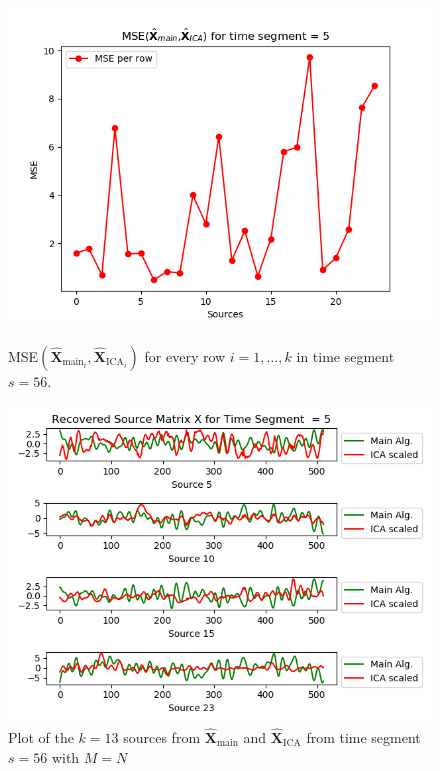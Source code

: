 \begin{figure}[H]
\begin{widepage}
    \begin{minipage}[t]{.45\textwidth}
\centering
\includegraphics[width=1\linewidth]{figures/ch_7/resultat/mse_none_removed_ica_timeseg5.png}
\caption{MSE$\left(\hat{\mathbf{X}}_{\text{main}_{i}},\hat{\mathbf{X}}_{\text{ICA}_{i}}\right)$ for every row $i = 1, \dots, k$ in time segment $s=56$.}
\label{fig:M=N_2}
\end{minipage} 
\hspace{0.5cm}
\begin{minipage}[t]{.45\textwidth}
\centering
\includegraphics[width=1\linewidth]{figures/ch_7/resultat/EEG_none_removed_scaled_timeseg5S1_CClean.png}
\caption{Plot of the $k = 13$ sources from $\hat{\mathbf{X}}_{\text{main}}$ and $\hat{\mathbf{X}}_{\text{ICA}}$ from time segment $s = 56$ with $M = N$}
	\label{fig:M=N_3}
    \end{minipage}
\end{widepage}
\end{figure}

